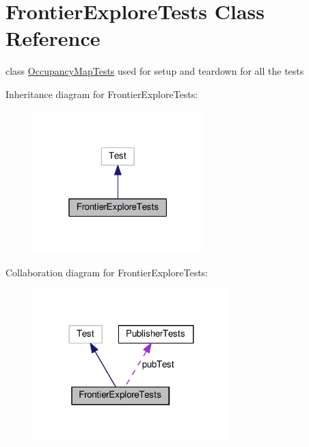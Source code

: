 \hypertarget{classFrontierExploreTests}{}\section{Frontier\+Explore\+Tests Class Reference}
\label{classFrontierExploreTests}


class \hyperlink{classOccupancyMapTests}{Occupancy\+Map\+Tests} used for setup and teardown for all the tests  




Inheritance diagram for Frontier\+Explore\+Tests\+:
\nopagebreak
\begin{figure}[H]
\begin{center}
\leavevmode
\includegraphics[width=187pt]{classFrontierExploreTests__inherit__graph}
\end{center}
\end{figure}


Collaboration diagram for Frontier\+Explore\+Tests\+:
\nopagebreak
\begin{figure}[H]
\begin{center}
\leavevmode
\includegraphics[width=216pt]{classFrontierExploreTests__coll__graph}
\end{center}
\end{figure}
